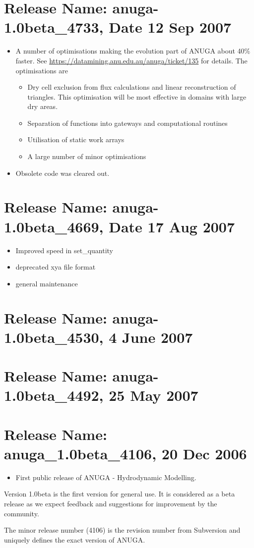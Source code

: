 \documentclass{manual}
\begin{document}
\section{Release Name: anuga-1.0beta_4733, Date 12 Sep 2007}

\begin{itemize} 
  \item A number of optimisations making the evolution part of ANUGA about 40\% faster. See \url{https://datamining.anu.edu.au/anuga/ticket/135} for details. 
  The optimisations are 
  \begin{itemize} 
     \item Dry cell exclusion from flux calculations and linear reconstruction of triangles. 
     This optimisation will be most effective in domains with large dry areas.  
     \item Separation of functions into gateways and computational routines 
     \item Utilisation of static work arrays 
     \item A large number of minor optimisations 
  \end{itemize} 
  
  \item Obsolete code was cleared out. 
\end{itemize}   


\section{Release Name: anuga-1.0beta_4669, Date 17 Aug 2007}
\begin{itemize} 
  \item Improved speed in set\_quantity
  \item deprecated xya file format
  \item general maintenance
\end{itemize}    
  
\section{Release Name: anuga-1.0beta_4530, 4 June 2007}

\section{Release Name: anuga-1.0beta_4492, 25 May 2007}

\section{Release Name: anuga_1.0beta_4106, 20 Dec 2006}

\begin{itemize} 
  \item First public release of ANUGA - Hydrodynamic Modelling.
\end{itemize} 
Version 1.0beta is the first version for general use. It is considered as a beta release as we expect feedback and suggestions for improvement by the community.

The minor release number (4106) is the revision number from Subversion and uniquely defines the exact version of ANUGA.
\end{document}
